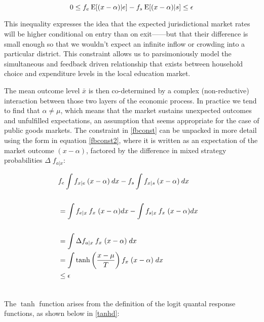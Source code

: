 \begin{equation} \label{fbconst}
0 \leq f_{e} \: \mathrm{E}[(x-\alpha) |e ]-f_{s}\:\mathrm{E}[(x-\alpha) | s] \leq \epsilon\\
\end{equation}


\medskip 

This inequality expresses the idea that the expected jurisdictional
market rates will be higher conditional on entry than on exit——but
that their difference is small enough so that we wouldn't expect an
infinite inflow or crowding into a particular district. This
constraint allows us to parsimoniously model the simultaneous and
feedback driven relationship that exists between household choice and
expenditure levels in the local education market.

The mean outcome level $\bar{x}$ is then co-determined by a complex (non-reductive)
interaction between those two layers of the economic
process. In practice we tend to find that $\alpha \neq \mu$, which means that
the market sustains unexpected outcomes and unfulfilled expectations,
an assumption that seems appropriate for the case of public goods markets. The constraint in \ref{fbconst} can be unpacked in more detail using
the form in equation \ref{fbconst2}, where it is written as an
expectation of the market outcome $(x-\alpha)$, factored by the
difference in mixed strategy probabilities $\Delta \; f_{a|x}$:

\begin{equation} \label{fbconst2} 
\begin{aligned}
&f_{e}\int f_{x|e}\:(x-\alpha) \: dx - f_{s}\int f_{x|s} \: (x-\alpha) \: dx\\
&\\
&= \int f_{e|x}\:f_{x}\;(x-\alpha) dx - \int f_{s|x}\:f_{x}\;(x-\alpha) dx\\
&\\
&= \int \Delta f_{a|x} \: f_{x} \; (x-\alpha) \; dx 
&\\
&=  \int \operatorname{tanh}\left(\frac{x-\mu}{T}\right) f_{x} \; (x-\alpha) \space \; dx \\
& \leq \epsilon \\
&\\
\end{aligned}
\end{equation}

\medskip 


The $\operatorname{tanh}$ function arises from the definition of the
logit quantal response functions, as shown below in \ref{tanhd}:


